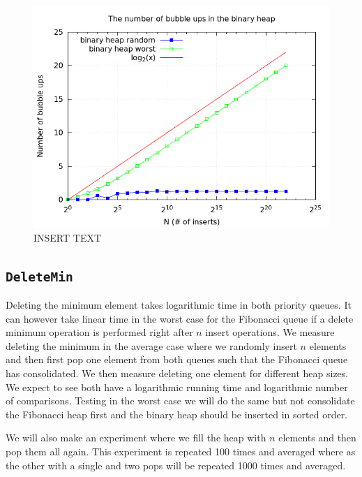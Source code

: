 \documentclass[a4paper,oneside,article,11pt]{memoir}
\begin{document}
\begin{figure}[H]
\centering
  \includegraphics[scale=0.5]{../res/inserts/insert_bubble_up.png}%
  \caption{INSERT TEXT}
  \label{fig:bubble_ups}
\end{figure}

\subsection{\texttt{DeleteMin}}
Deleting the minimum element takes logarithmic time in both priority queues. It can however take linear time in the worst case for the Fibonacci queue if a delete minimum operation is performed right after $n$ insert operations. We measure deleting the minimum in the average case where we randomly insert $n$ elements and then first pop one element from both queues such that the Fibonacci queue has consolidated. We then measure deleting one element for different heap sizes. We expect to see both have a logarithmic running time and logarithmic number of comparisons.
Testing in the worst case we will do the same but not consolidate the Fibonacci heap first and the binary heap should be inserted in sorted order.

We will also make an experiment where we fill the heap with $n$ elements and then pop them all again. This experiment is repeated 100 times and averaged where as the other with a single and two pops will be repeated 1000 times and averaged.
\end{document}
